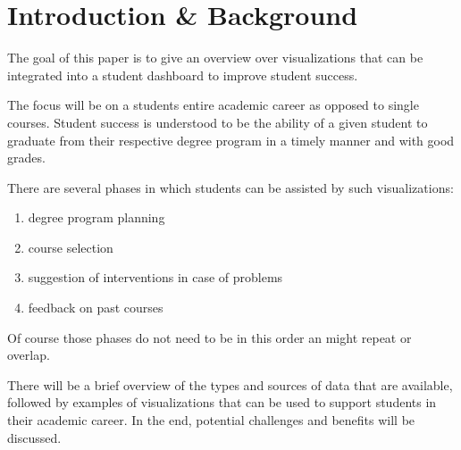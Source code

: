 \section{Introduction \& Background}
\label{sec:introcution}

The goal of this paper is to give an overview over visualizations that can be integrated into a student dashboard to improve student success.

The focus will be on a students entire academic career as opposed to single courses. Student success is understood to be the ability of a given student to graduate from their respective degree program in a timely manner and with good grades.

There are several phases in which students can be assisted by such visualizations:

\begin{enumerate}
    \item degree program planning
    \item course selection
    \item suggestion of interventions in case of problems
    \item feedback on past courses
\end{enumerate}

Of course those phases do not need to be in this order an might repeat or overlap.

There will be a brief overview of the types and sources of data that are available, followed by examples of visualizations that can be used to support students in their academic career. In the end, potential challenges and benefits will be discussed.
